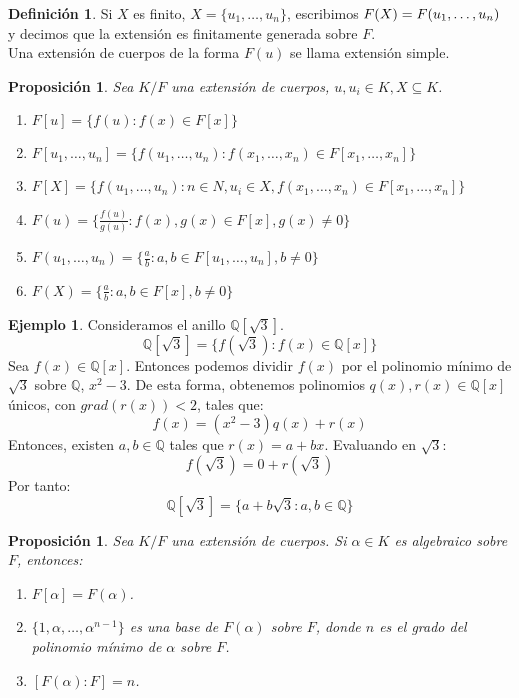 \documentclass{report}
\newtheorem{proposition}[theorem]{Proposición}
\theoremstyle{remark}
\theoremstyle{definition}
\newtheorem{definition}{Definición}[chapter]
\theoremstyle{definition}
\theoremstyle{definition}
\newtheorem*{example}{Ejemplo}
\begin{document}
\begin{definition}
    Si $X$ es finito, $X = \{u_1, \dots, u_n\}$, escribimos $F(X) =\\F(u_1, \dots, u_n)$ y decimos que la extensión es finitamente generada sobre $F$.\\
    Una extensión de cuerpos de la forma $F(u)$ se llama extensión simple.
\end{definition}

\begin{proposition}
    Sea $K/F$ una extensión de cuerpos, $u, u_i \in K, X \subseteq K$.
    \begin{enumerate}
        \item $F[u] = \{ f(u) : f(x) \in F[x] \}$
        \item $F[u_1, \dots, u_n] = \{ f(u_1, \dots, u_n) : f(x_1, \dots, x_n) \in F[x_1, \dots, x_n] \}$
        \item $F[X] = \{ f(u_1, \dots, u_n) : n \in N, u_i \in X, f(x_1, \dots, x_n) \in F[x_1, \dots, x_n] \}$
        \item $F(u) = \{ \frac{f(u)}{g(u)} : f(x), g(x) \in F[x], g(x) \neq 0 \}$
        \item $F(u_1, \dots, u_n) = \{ \frac{a}{b} : a, b \in F[u_1, \dots, u_n], b \neq 0 \}$
        \item $F(X) = \{ \frac{a}{b} : a, b \in F[x], b \neq 0 \}$
    \end{enumerate}
\end{proposition}

\begin{example}
    Consideramos el anillo $\mathbb{Q}[\sqrt{3}]$.
    $$\mathbb{Q}[\sqrt{3}] = \{ f(\sqrt{3}) : f(x) \in \mathbb{Q}[x] \}$$
    Sea $f(x) \in \mathbb{Q}[x]$. Entonces podemos dividir $f(x)$ por el polinomio mínimo de $\sqrt{3}$ sobre $\mathbb{Q}$, $x^2 - 3$. De esta forma, obtenemos polinomios $q(x), r(x) \in \mathbb{Q}[x]$ únicos, con $grad(r(x)) < 2$, tales que:
    $$f(x) = (x^2 - 3)q(x) + r(x)$$
    Entonces, existen $a, b \in \mathbb{Q}$ tales que $r(x) = a + bx$. Evaluando en $\sqrt{3}$:
    $$f(\sqrt{3}) = 0 + r(\sqrt{3})$$
    Por tanto:
    $$\mathbb{Q}[\sqrt{3}] = \{ a + b\sqrt{3} : a, b \in \mathbb{Q} \}$$
\end{example}

\begin{proposition}
    Sea $K/F$ una extensión de cuerpos. Si $\alpha \in K$ es algebraico sobre $F$, entonces:
    \begin{enumerate}
        \item $F[\alpha] = F(\alpha)$.
        \item $\{1, \alpha, \dots, \alpha^{n-1} \}$ es una base de $F(\alpha)$ sobre $F$, donde $n$ es el grado del polinomio mínimo de $\alpha$ sobre $F$.
        \item $[F(\alpha) : F] = n$.
    \end{enumerate}
\end{proposition}
\end{document}
